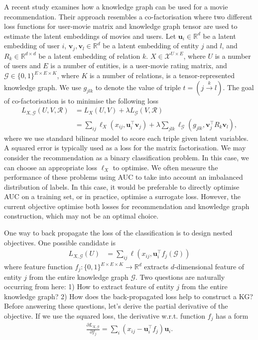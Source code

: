 \documentclass{article} %
\theoremstyle{definition}
\newcommand\mc{\mathcal} %
\newcommand\ts{\mathcal} %
\newcommand\mt{} %
\newcommand\vt{\mathbf} %
\newcommand\fn{} %
\newcommand\triple[3]{(#1 \stackrel{#2}\rightarrow #3)}
\begin{document}
A recent study \cite{Zhang2016} examines how a knowledge graph can be used for a movie recommendation. Their approach resembles a co-factorisation where two different loss functions for user-movie matrix and knowledge graph tensor are used to estimate the latent embeddings of movies and users.
Let $\vt{u}_i \in \mathbb{R}^d$ be a latent embedding of user $i$, $\vt{v}_j, \vt{v}_l \in \mathbb{R}^d$ be a latent embedding of entity $j$ and $l$, and $\mt{R}_{k} \in \mathbb{R}^{d\times d}$ be a latent embedding of relation $k$. $X \in \mc{X}^{U \times E}$, where $U$ is a number of users and $E$ is a number of entities, is a user-movie rating matrix, and $\ts{G} \in \{0,1\}^{E\times E \times K}$, where $K$ is a number of relations, is a tensor-represented knowledge graph. We use $g_{jlk}$ to denote the value of triple $t=\triple{j}{k}{l}$. The goal of co-factorisation is to minimise the following loss
\begin{align}
L_{X, \ts{G}}(\mt{U}, \mt{V}, \ts{R}) & = L_X(\mt{U}, \mt{V}) + \lambda L_\ts{G}(\mt{V}, \ts{R})\\
& = \sum_{ij}\ell_X(x_{ij}, \vt{u}_{i}^\top \vt{v}_j) + \lambda \sum_{jlk}\ell_\ts{G}(g_{jlk}, \vt{v}_j^\top \mt{R}_{k} \vt{v}_{l}), \label{eqn:two_losses}
\end{align}
where we use standard bilinear model to score each triple given latent variables.
A squared error is typically used as a loss for the matrix factorisation. We may consider the recommendation as a binary classification problem. In this case, we can choose an appropriate loss $\ell_X$ to optimise.  We often measure the performance of these problems using AUC to take into account an imbalanced distribution of labels. In this case, it would be preferable to directly optimise AUC on a training set, or in practice, optimise a surrogate loss. However, the current objective optimise both losses for recommendation and knowledge graph construction, which may not be an optimal choice.

One way to back propagate the loss of the classification is to design nested objectives. One possible candidate is
\begin{align}
\label{eqn:obj}
L_{X, \ts{G}}(\mt{U}) & = \sum_{ij}\ell(x_{ij}, \vt{u}_{i}^\top \fn{f}_j(\ts{G}))
\end{align}
where feature function $\fn{f}_j : \{0,1\}^{E\times E\times K} \rightarrow \mathbb{R}^d$ extracts $d$-dimensional feature of entity $j$ from the entire knowledge graph $\ts{G}$. Two questions are naturally occurring from here: 1) How to extract feature of entity $j$ from the entire knowledge graph? 2) How does the back-propagated loss help to construct a KG? Before answering these questions, let's derive the partial derivative of the objective. If we use the squared loss, the derivative w.r.t. function $\fn{f}_j$ has a form
\begin{align}
\frac{\partial L_{X, \ts{G}}}{\partial \fn{f}_j} = \sum_{i}(x_{ij} - \vt{u}_i^\top \fn{f}_j) \vt{u}_i.
\end{align}
\end{document}
